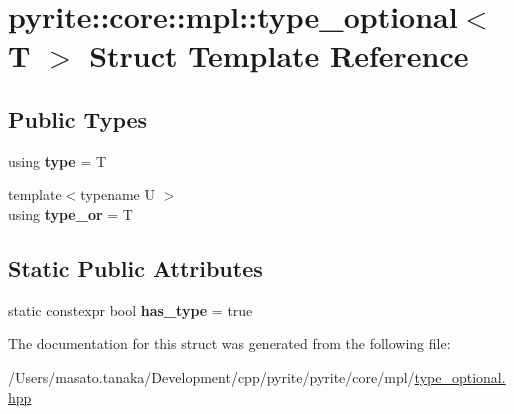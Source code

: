 \hypertarget{structpyrite_1_1core_1_1mpl_1_1type__optional_3_01_t_01_4}{}\section{pyrite\+:\+:core\+:\+:mpl\+:\+:type\+\_\+optional$<$ T $>$ Struct Template Reference}
\label{structpyrite_1_1core_1_1mpl_1_1type__optional_3_01_t_01_4}
\subsection*{Public Types}
\begin{DoxyCompactItemize}
\item 
\mbox{\label{structpyrite_1_1core_1_1mpl_1_1type__optional_3_01_t_01_4_abdc68e65d67b41f0b623b91110b7ecfa}} 
using {\bfseries type} = T
\item 
\mbox{\label{structpyrite_1_1core_1_1mpl_1_1type__optional_3_01_t_01_4_ad67358168a5031ae600651471a040700}} 
{\footnotesize template$<$typename U $>$ }\\using {\bfseries type\+\_\+or} = T
\end{DoxyCompactItemize}
\subsection*{Static Public Attributes}
\begin{DoxyCompactItemize}
\item 
\mbox{\label{structpyrite_1_1core_1_1mpl_1_1type__optional_3_01_t_01_4_ab4721d2101fded2df69667c35014f6d9}} 
static constexpr bool {\bfseries has\+\_\+type} = true
\end{DoxyCompactItemize}


The documentation for this struct was generated from the following file\+:\begin{DoxyCompactItemize}
\item 
/\+Users/masato.\+tanaka/\+Development/cpp/pyrite/pyrite/core/mpl/\mbox{\hyperlink{core_2mpl_2type__optional_8hpp}{type\+\_\+optional.\+hpp}}\end{DoxyCompactItemize}
